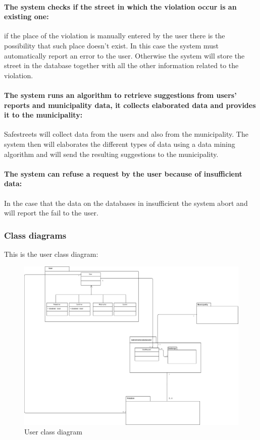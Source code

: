 \documentclass[titlepage]{article}
\begin{document}
\paragraph{The system checks if the street in which the 				violation occur is an existing one: }
if the place of the violation is manually entered by the user there is the possibility that such place doesn't exist. In this case the system must automatically report an error to the user. Otherwise the system will store the street in the database together with all the other information related to the violation.
\paragraph{The system runs an algorithm to retrieve suggestions from users' reports and municipality data, it collects elaborated data and provides it to the municipality: }
Safestreets will collect data from the users and also from the municipality. The system then will elaborates the different types of data using a data mining algorithm and will send the resulting suggestions to the municipality. 
\paragraph{The system can refuse a request by the user because of 
	insufficient data:}
	In the case that the data on the databases in insufficient the system abort and will report the fail to the 
	user.
\subsubsection{Class diagrams}
This is the user class diagram:
\begin{figure}[h
]
	\includegraphics[scale=0.332]{UML users v1.0.png}
	\centering
	\caption{User class diagram}
\end{figure}
\FloatBarrier
\end{document}

